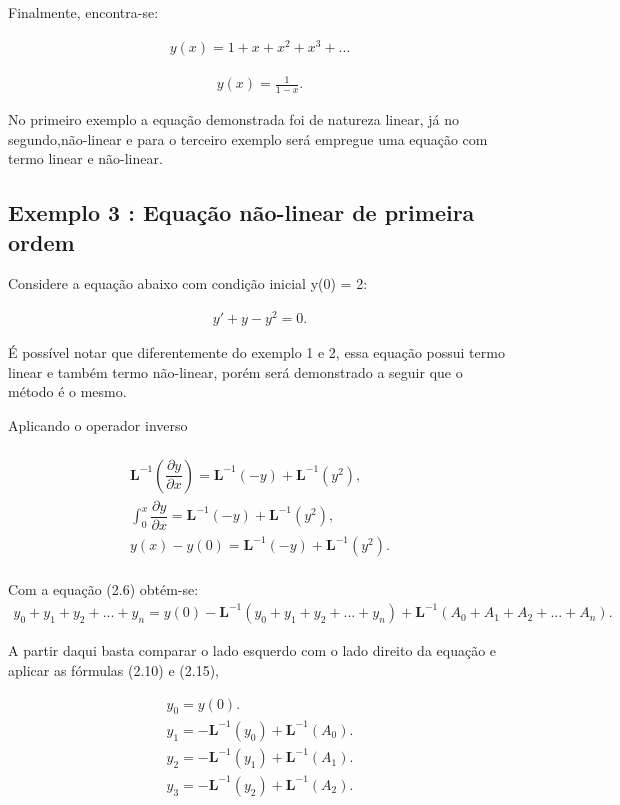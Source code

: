 Finalmente, encontra-se:

\begin{gather*}
y(x) = 1 + x+ x^2 + x^3 +...
\end{gather*}

\begin{gather*}
y(x) = \frac {1}{1-x}.
\end{gather*}

No primeiro exemplo a equação demonstrada foi de natureza linear, já no segundo,não-linear e para o terceiro exemplo será empregue uma equação  com termo linear e não-linear.

\subsection{Exemplo 3 : Equação não-linear de primeira ordem}

Considere a equação abaixo com condição inicial y(0) = 2:

\begin{gather*}
y' + y - y^2 = 0.
\end{gather*}

É possível notar que diferentemente do exemplo 1 e 2, essa equação possui termo linear e também termo não-linear, porém será demonstrado a seguir que o método é o mesmo.

Aplicando o operador inverso

\begin{gather*}\nonumber\\
 \textbf{L}^{-1}\left(\dfrac{\partial y}{\partial x}\right) = \textbf{L}^{-1}(-y) + \textbf{L}^{-1}(y^2),\nonumber\\
 \int_0^{x}\dfrac{\partial y}{\partial x} = \textbf{L}^{-1} (-y) + \textbf{L}^{-1} (y^2),\nonumber\\
 y(x)-y(0) = \textbf{L}^{-1} (-y) + \textbf{L}^{-1} (y^2).\nonumber\\
 \end{gather*}

Com a equação (2.6) obtém-se:
\begin{gather*}
 y_{0} +y_{1} + y_{2} + ... + y_{n}  =  y(0) - \textbf{L}^{-1}( y_{0} +y_{1} + y_{2} + ... + y_{n} ) +\textbf{L}^{-1}( A_{0} +A_{1} + A_{2} + ... + A_{n}).
 \end{gather*}

A partir daqui basta comparar o lado esquerdo com o lado direito da equação e aplicar as fórmulas (2.10) e (2.15),

\begin{gather*}
y_{0} = y(0).\nonumber\\
y_{1} = -\textbf{L}^{-1}(y_{0}) + \textbf{L}^{-1}(A_{0}).\nonumber\\
y_{2} = -\textbf{L}^{-1}(y_{1}) + \textbf{L}^{-1}(A_{1}).\nonumber\\
y_{3} = -\textbf{L}^{-1}(y_{2}) + \textbf{L}^{-1}(A_{2}).\nonumber\\
\end{gather*}


